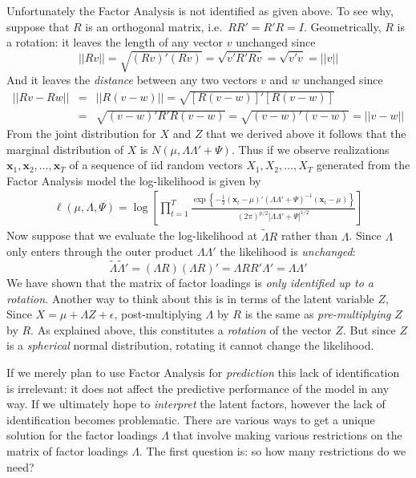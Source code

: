 \documentclass[12pt]{article}
\theoremstyle{definition}
\begin{document}
Unfortunately the Factor Analysis is not identified as given above. To see why, suppose that $R$ is an orthogonal matrix, i.e.\ $RR' = R'R = I$. Geometrically, $R$ is a rotation: it leaves the length of any vector $v$ unchanged since
	$$|| Rv || = \sqrt{(Rv)'(Rv)} = \sqrt{v' R'R v} = \sqrt{v'v} = ||v||$$ 
And it leaves the \emph{distance} between any two vectors $v$ and $w$ unchanged since
	\begin{eqnarray*}
		||Rv - Rw|| &=& ||R(v-w)|| = \sqrt{\left[R(v-w) \right]' \left[ R(v-w)\right]}\\
			&=& \sqrt{(v-w)'R'R(v-w)} = \sqrt{(v-w)'(v-w)} = ||v-w||
	\end{eqnarray*}
From the joint distribution for $X$ and $Z$ that we derived above it follows that the marginal distribution of $X$ is $N(\mu, \Lambda \Lambda' + \Psi)$. Thus if we observe realizations $\mathbf{x}_1, \mathbf{x}_2, \hdots, \mathbf{x}_T$ of a sequence of iid random vectors $X_1, X_2, \hdots, X_T$ generated from the Factor Analysis model the log-likelihood is given by
	\begin{eqnarray*}
		\ell(\mu, \Lambda, \Psi) = \log \left[ \prod_{t = 1}^T \frac{\exp \left\{ -\frac{1}{2} \left(\mathbf{x}_t - \mu \right)' \left(\Lambda \Lambda' + \Psi \right)^{-1} \left(\mathbf{x}_t - \mu \right)\right\}}{(2\pi)^{p/2}\left| \Lambda \Lambda' + \Psi \right|^{1/2}} \right] 
	\end{eqnarray*}
Now suppose that we evaluate the log-likelihood at $\widetilde{\Lambda}R$ rather than $\Lambda$. Since $\Lambda$ only enters through the outer product $\Lambda \Lambda'$ the likelihood is \emph{unchanged}: 
	$$\widetilde{\Lambda} \widetilde{\Lambda}' = (\Lambda R)(\Lambda R)' = \Lambda RR' \Lambda' = \Lambda \Lambda'$$
We have shown that the matrix of factor loadings is \emph{only identified up to a rotation}. Another way to think about this is in terms of the latent variable $Z$, Since $X = \mu + \Lambda Z + \epsilon$, post-multiplying $\Lambda$ by $R$ is the same as \emph{pre-multiplying} $Z$ by $R$. As explained above, this constitutes a \emph{rotation} of the vector $Z$. But since $Z$ is a \emph{spherical} normal distribution, rotating it cannot change the likelihood.


If we merely plan to use Factor Analysis for \emph{prediction} this lack of identification is irrelevant: it does not affect the predictive performance of the model in any way. If we ultimately hope to \emph{interpret} the latent factors, however the lack of identification becomes problematic. There are various ways to get a unique solution for the factor loadings $\Lambda$ that involve making various restrictions on the matrix of factor loadings $\Lambda$. The first question is: so how many restrictions do we need?
\end{document}
